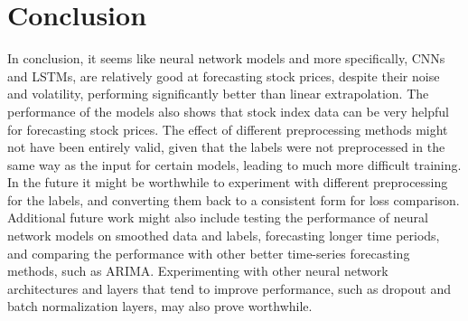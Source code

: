 \documentclass[conference]{IEEEtran}
\begin{document}
\section{Conclusion}
In conclusion, it seems like neural network models and more specifically, CNNs and LSTMs, are relatively good at forecasting stock prices, despite their noise and volatility, performing significantly better than linear extrapolation. The performance of the models also shows that stock index data can be very helpful for forecasting stock prices. The effect of different preprocessing methods might not have been entirely valid, given that the labels were not preprocessed in the same way as the input for certain models, leading to much more difficult training. In the future it might be worthwhile to experiment with different preprocessing for the labels, and converting them back to a consistent form for loss comparison. Additional future work might also include testing the performance of neural network models on smoothed data and labels, forecasting longer time periods, and comparing the performance with other better time-series forecasting methods, such as ARIMA. Experimenting with other neural network architectures and layers that tend to improve performance, such as dropout and batch normalization layers, may also prove worthwhile.

\clearpage
\nocite{*}


\end{document}
